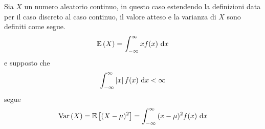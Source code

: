 \documentclass{subfiles}
\begin{document}
Sia \(X\) un numero aleatorio continuo, in questo caso estendendo la definizioni data per il caso discreto al caso continuo,
il valore atteso e la varianza di \(X\) sono definiti come segue.
\[
    \Expected{X} = \Int{x f(x)}{x}[-\infty][\infty]
\]
e supposto che
\[
    \Int{\Abs{x} f(x)}{x}[-\infty][\infty] < \infty
\]
segue
\[
    \Var{X} = \Expected*{(X - \mu)^{2}} = \Int{(x - \mu)^{2} f(x)}{x}[-\infty][\infty]
\]
\end{document}
